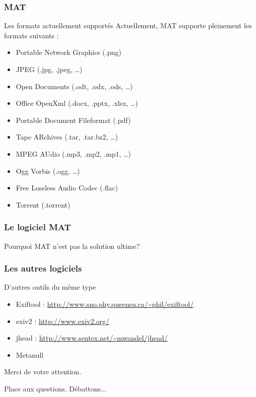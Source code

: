 \documentclass{beamer}
\begin{document}
\begin{frame}
\frametitle{MAT}

\begin{block}{Les formats actuellement supportés}
Actuellement, MAT supporte pleinement les formats suivants :
\begin{itemize}
\item Portable Network Graphics (.png)
\item JPEG (.jpg, .jpeg, …)
\item Open Documents (.odt, .odx, .ods, …)
\item Office OpenXml (.docx, .pptx, .xlsx, …)
\item Portable Document Fileformat (.pdf)
\item Tape ARchives (.tar, .tar.bz2, …)
\item MPEG AUdio (.mp3, .mp2, .mp1, …)
\item Ogg Vorbis (.ogg, …)
\item Free Lossless Audio Codec (.flac)
\item Torrent (.torrent)
\end{itemize}
\end{block}
\end{frame}


\begin{frame}
\frametitle{Le logiciel MAT}
\begin{block}{Pourquoi MAT n'est pas la solution ultime?}
\end{block}
\end{frame}


\begin{frame}
\frametitle{Les autres logiciels}

\begin{block}{D'autres outils du même type}
\begin{itemize}
\item Exiftool : \url{http://www.sno.phy.queensu.ca/~phil/exiftool/}
\item exiv2 : \url{http://www.exiv2.org/}
\item jhead : \url{http://www.sentex.net/~mwandel/jhead/}
\item Metanull
\end{itemize}
\end{block}
\end{frame}

\begin{frame}
\Huge{\centerline{Merci de votre attention.}}
\Huge{\centerline{Place aux questions. Débattons...}}
\end{frame}
\end{document}
